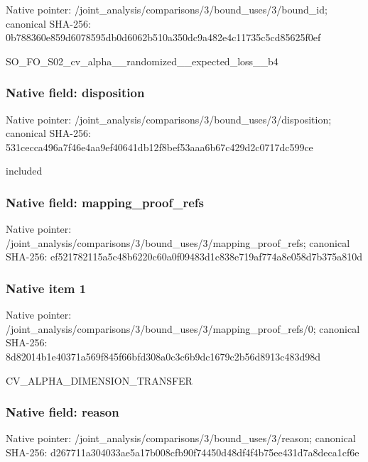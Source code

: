 \documentclass[10pt,a4paper]{article}
\begin{document}
Native pointer: /joint\_analysis/comparis\allowbreak{}ons/3/bound\_uses/3/bound\allowbreak{}\_id; canonical SHA-256: 0b788360e859d6078595db0d\allowbreak{}6062b510a350dc9a482e4c11\allowbreak{}735c5cd85625f0ef


SO\_FO\_S02\_cv\_alpha\_\_rand\allowbreak{}omized\_\_expected\_loss\_\_b\allowbreak{}4


\subsubsection{Native field: disposition}


Native pointer: /joint\_analysis/comparis\allowbreak{}ons/3/bound\_uses/3/dispo\allowbreak{}sition; canonical SHA-256: 531cecca496a7f46e4aa9ef4\allowbreak{}0641db12f8bef53aaa6b67c4\allowbreak{}29d2c0717dc599ce


included


\subsubsection{Native field: mapping\_proof\_refs}


Native pointer: /joint\_analysis/comparis\allowbreak{}ons/3/bound\_uses/3/mappi\allowbreak{}ng\_proof\_refs; canonical SHA-256: ef521782115a5c48b6220c60\allowbreak{}a0f09483d1c838e719af774a\allowbreak{}8e058d7b375a810d



\subsubsection{Native item 1}


Native pointer: /joint\_analysis/comparis\allowbreak{}ons/3/bound\_uses/3/mappi\allowbreak{}ng\_proof\_refs/0; canonical SHA-256: 8d82014b1e40371a569f845f\allowbreak{}66bfd308a0c3c6b9dc1679c2\allowbreak{}b56d8913c483d98d


CV\_ALPHA\_DIMENSION\_TRANSFER


\subsubsection{Native field: reason}


Native pointer: /joint\_analysis/comparis\allowbreak{}ons/3/bound\_uses/3/reaso\allowbreak{}n; canonical SHA-256: d267711a304033ae5a17b008\allowbreak{}cfb90f74450d48df4f4b75ee\allowbreak{}431d7a8deca1cf6e
\end{document}
